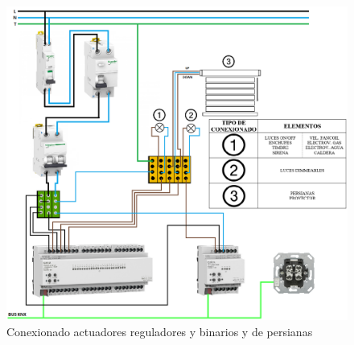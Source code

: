 \begin{flushleft}
\begin{figure}[h]
\includegraphics[width=1.15\textwidth]{figures/conex_ilu.png}   
\caption{Conexionado actuadores reguladores y binarios y de persianas}
\label{fig:conex_ilu}
\end{figure}
\end{flushleft}

